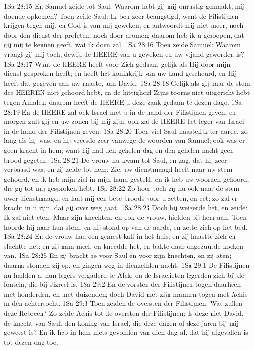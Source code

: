 1Sa 28:15  En Samuel zeide tot Saul: Waarom hebt gij mij onrustig gemaakt, mij doende opkomen? Toen zeide Saul: Ik ben zeer beangstigd, want de Filistijnen krijgen tegen mij, en God is van mij geweken, en antwoordt mij niet meer, noch door den dienst der profeten, noch door dromen; daarom heb ik u geroepen, dat gij mij te kennen geeft, wat ik doen zal.
1Sa 28:16  Toen zeide Samuel: Waarom vraagt gij mij toch, dewijl de HEERE van u geweken en uw vijand geworden is?
1Sa 28:17  Want de HEERE heeft voor Zich gedaan, gelijk als Hij door mijn dienst gesproken heeft; en heeft het koninkrijk van uw hand gescheurd, en Hij heeft dat gegeven aan uw naaste, aan David.
1Sa 28:18  Gelijk als gij naar de stem des HEEREN niet gehoord hebt, en de hittigheid Zijns toorns niet uitgericht hebt tegen Amalek; daarom heeft de HEERE u deze zaak gedaan te dezen dage.
1Sa 28:19  En de HEERE zal ook Israel met u in de hand der Filistijnen geven, en morgen zult gij en uw zonen bij mij zijn; ook zal de HEERE het leger van Israel in de hand der Filistijnen geven.
1Sa 28:20  Toen viel Saul haastelijk ter aarde, zo lang als hij was, en hij vreesde zeer vanwege de woorden van Samuel; ook was er geen kracht in hem; want hij had den gehelen dag en den gehelen nacht geen brood gegeten.
1Sa 28:21  De vrouw nu kwam tot Saul, en zag, dat hij zeer verbaasd was; en zij zeide tot hem: Zie, uw dienstmaagd heeft naar uw stem gehoord, en ik heb mijn ziel in mijn hand gesteld, en ik heb uw woorden gehoord, die gij tot mij gesproken hebt.
1Sa 28:22  Zo hoor toch gij nu ook naar de stem uwer dienstmaagd, en laat mij een bete broods voor u zetten, en eet; zo zal er kracht in u zijn, dat gij over weg gaat.
1Sa 28:23  Doch hij weigerde het, en zeide: Ik zal niet eten. Maar zijn knechten, en ook de vrouw, hielden bij hem aan. Toen hoorde hij naar hun stem, en hij stond op van de aarde, en zette zich op het bed.
1Sa 28:24  En de vrouw had een gemest kalf in het huis; en zij haastte zich en slachtte het; en zij nam meel, en kneedde het, en bakte daar ongezuurde koeken van.
1Sa 28:25  En zij bracht ze voor Saul en voor zijn knechten, en zij aten; daarna stonden zij op, en gingen weg in dienzelfden nacht.
1Sa 29:1  De Filistijnen nu hadden al hun legers vergaderd te Afek; en de Israelieten legerden zich bij de fontein, die bij Jizreel is.
1Sa 29:2  En de vorsten der Filistijnen togen daarheen met honderden, en met duizenden; doch David met zijn mannen togen met Achis in den achtertocht.
1Sa 29:3  Toen zeiden de oversten der Filistijnen: Wat zullen deze Hebreen? Zo zeide Achis tot de oversten der Filistijnen: Is deze niet David, de knecht van Saul, den koning van Israel, die deze dagen of deze jaren bij mij geweest is? En ik heb in hem niets gevonden van dien dag af, dat hij afgevallen is tot dezen dag toe.

